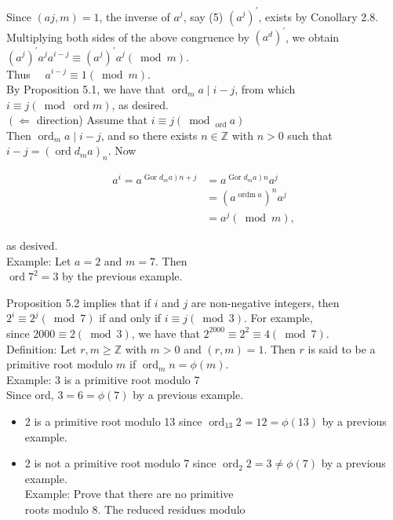 \documentclass[10pt]{article}
\begin{document}
Since $(a j, m)=1$, the inverse of $a^{j}$, say (5) $\left(a^{j}\right)^{\prime}$, exists by Conollary 2.8. Multiplying both sides of the above congruence by $\left(a^{d}\right)^{\prime}$, we obtain $\left(a^{j}\right)^{\prime} a^{j} a^{i-j} \equiv\left(a^{j}\right)^{\prime} a^{j}(\bmod m)$.\\
Thus $\quad a^{i-j} \equiv 1(\bmod m)$.\\
By Proposition 5.1, we have that $\operatorname{ord}_{m} a \mid i-j$, from which $i \equiv j(\bmod \operatorname{ord} m)$, as desired.\\
$\left(\Leftarrow\right.$ direction) Assume that $i \equiv j\left(\bmod _{\text {ord }} a\right)$\\
Then $\operatorname{ord}_{m} a \mid i-j$, and so there exists $n \in \mathbb{Z}$ with $n>0$ such that $i-j=\left(\operatorname{ord} d_{m} a\right)_{n}$. Now

$$
\begin{aligned}
a^{i}=a^{\left.\operatorname{Gor} d_{m} a\right) n+j} & =a^{\left.\operatorname{Gor} d_{m} a\right) n} a^{j} \\
& =\left(a^{\operatorname{ordm} a}\right)^{n} a^{j} \\
& =a^{j}(\bmod m),
\end{aligned}
$$

as desived.\\
Example: Let $a=2$ and $m=7$. Then\\
$\operatorname{ord} 7^{2}=3$ by the previous example.

Proposition 5.2 implies that if $i$ and $j$ are non-negative integers, then $2^{i} \equiv 2^{j}(\bmod 7)$ if and only if $i \equiv j(\bmod 3)$. For example,\\
since $2000 \equiv 2(\bmod 3)$, we have that $2^{2000} \equiv 2^{2} \equiv 4(\bmod 7)$.\\
Definition: Let $r, m \geq \mathbb{Z}$ with $m>0$ and $(r, m)=1$. Then $r$ is said to be a primitive root modulo $m$ if $\operatorname{ord}_{m} n=\phi(m)$.\\
Example: 3 is a primitive root modulo 7\\
Since ord, $3=6=\phi(7)$ by a previous example.

\begin{itemize}
  \item 2 is a primitive root modulo 13 since $\operatorname{ord}_{13} 2=12=\phi(13)$ by a previous example.
  \item 2 is not a primitive root modulo 7 since $\operatorname{ord}_{2} 2=3 \neq \phi(7)$ by a previous example.\\
Example: Prove that there are no primitive\\
roots modulo 8. The reduced residues modulo
\end{itemize}
\end{document}
